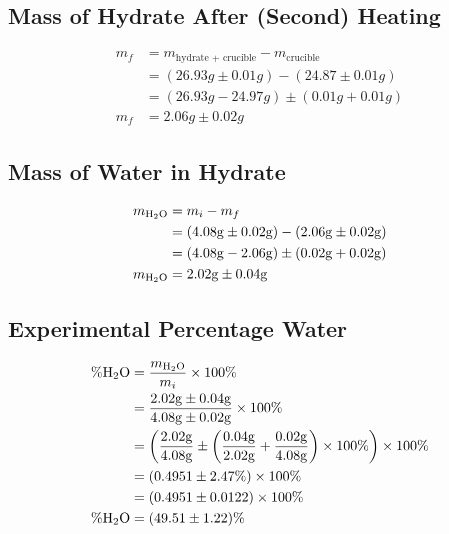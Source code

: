 \documentclass{article}
\begin{document}
\subsection{Mass of Hydrate After (Second) Heating}

\begin{align*}
    m_f & = m_{\text{hydrate + crucible}} - m_{\text{crucible}}       \\
        & = (26.93g \pm 0.01\si{g}) - (24.87 \pm 0.01\si{g})          \\
        & = (26.93\si{g} - 24.97\si{g}) \pm (0.01\si{g} + 0.01\si{g}) \\
    m_f & = 2.06\si{g} \pm 0.02\si{g}
\end{align*}

\subsection{Mass of Water in Hydrate}

\begin{align*}
    m_{\ce{H2O}} & = m_i - m_f                                                 \\
                 & = (4.08\si{g} \pm 0.02\si{g}) - (2.06\si{g} \pm 0.02\si{g}) \\
                 & = (4.08\si{g} - 2.06\si{g}) \pm (0.02\si{g} + 0.02\si{g})   \\
    m_{\ce{H2O}} & = 2.02\si{g} \pm 0.04\si{g}
\end{align*}

\subsection{Experimental Percentage Water}

\begin{align*}
    \%\ce{H2O} & = \frac{m_{\ce{H2O}}}{m_i} \times 100\%                                                                                                                   \\
               & = \frac{2.02\si{g} \pm 0.04\si{g}}{4.08\si{g} \pm 0.02\si{g}} \times 100\%                                                                                \\
               & = \left( \frac{2.02\si{g}}{4.08\si{g}} \pm \left( \frac{0.04\si{g}}{2.02\si{g}} + \frac{0.02\si{g}}{4.08\si{g}} \right) \times 100\% \right) \times 100\% \\
               & = (0.4951 \pm 2.47\%) \times 100\%                                                                                                                        \\
               & = (0.4951 \pm 0.0122) \times 100\%                                                                                                                        \\
    \%\ce{H2O} & = (49.51 \pm 1.22)\%
\end{align*}
\end{document}
